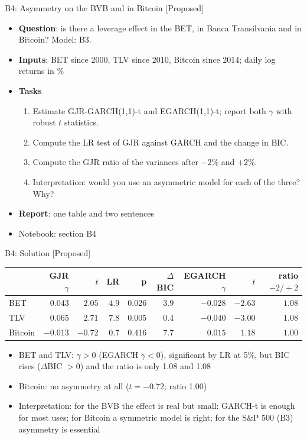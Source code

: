 \begin{frame}{B4: Asymmetry on the BVB and in Bitcoin [Proposed]}
\itemsize{\footnotesize}
\begin{itemize}
\item \textbf{Question}: is there a leverage effect in the BET, in Banca Transilvania and in Bitcoin? Model: B3.
\item \textbf{Inputs}: BET since 2000, TLV since 2010, Bitcoin since 2014; daily log returns in \%
\item \textbf{Tasks}
\begin{enumerate}
    \item Estimate GJR-GARCH(1,1)-t and EGARCH(1,1)-t; report both $\gamma$ with robust $t$ statistics.
    \item Compute the LR test of GJR against GARCH and the change in BIC.
    \item Compute the GJR ratio of the variances after $-2\%$ and $+2\%$.
    \item Interpretation: would you use an asymmetric model for each of the three? Why?
\end{enumerate}
\item \textbf{Report}: one table and two sentences
\item Notebook: section B4
\end{itemize}
\end{frame}

\ifsolutions
\begin{frame}{B4: Solution [Proposed]}
\itemsize{\footnotesize}
\begin{center}
\footnotesize
\begin{tabular}{lrrrrrrrr}
\toprule
& GJR $\gamma$ & $t$ & LR & p & $\Delta$BIC & EGARCH $\gamma$ & $t$ & ratio $-2/+2$ \\
\midrule
BET & $0.043$ & ${2.05}$ & $4.9$ & 0.026 & ${3.9}$ & ${-0.028}$ & ${-2.63}$ & $1.08$ \\
TLV & $0.065$ & ${2.71}$ & $7.8$ & 0.005 & ${0.4}$ & ${-0.040}$ & ${-3.00}$ & $1.08$ \\
Bitcoin & $-0.013$ & ${-0.72}$ & $0.7$ & 0.416 & ${7.7}$ & ${0.015}$ & ${1.18}$ & $1.00$ \\
\bottomrule
\end{tabular}
\end{center}
\begin{itemize}
    \item BET and TLV: $\gamma > 0$ (EGARCH $\gamma < 0$), significant by LR at 5\%, but BIC rises ($\Delta$BIC $> 0$) and the ratio is only 1.08 and 1.08
    \item Bitcoin: no asymmetry at all ($t = -0.72$; ratio 1.00)
    \item Interpretation: for the BVB the effect is real but small: GARCH-t is enough for most uses; for Bitcoin a symmetric model is right; for the S\&P 500 (B3) asymmetry is essential
\end{itemize}
\end{frame}
\fi

